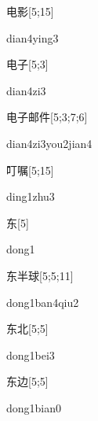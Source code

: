 \begin{verbete}{电影}[5;15]
\begin{pronuncia}{dian4ying3}
\end{pronuncia}
\end{verbete}

\begin{verbete}[dian4zi3]{电子}[5;3]
\begin{pronuncia}{dian4zi3}
\end{pronuncia}
\end{verbete}

\begin{verbete}{电子邮件}[5;3;7;6]
\begin{pronuncia}[\\]{dian4zi3you2jian4}
\end{pronuncia}
\end{verbete}

\begin{verbete}{叮嘱}[5;15]
\begin{pronuncia}{ding1zhu3}
\end{pronuncia}
\end{verbete}

\begin{verbete}[dong1]{东}[5]
\begin{pronuncia}{dong1}
\end{pronuncia}
\end{verbete}

\begin{verbete}{东半球}[5;5;11]
\begin{pronuncia}{dong1ban4qiu2}
\end{pronuncia}
\end{verbete}

\begin{verbete}{东北}[5;5]
\begin{pronuncia}{dong1bei3}
\end{pronuncia}
\end{verbete}

\begin{verbete}{东边}[5;5]
\begin{pronuncia}{dong1bian0}
\end{pronuncia}
\end{verbete}


